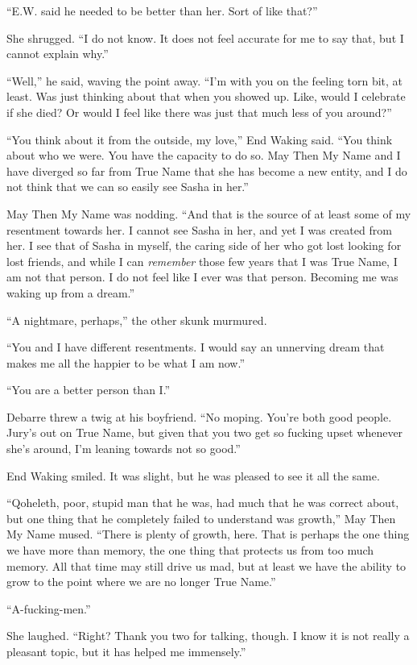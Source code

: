 ``E.W. said he needed to be better than her. Sort of like that?''

She shrugged. ``I do not know. It does not feel accurate for me to say that, but I cannot explain why.''

``Well,'' he said, waving the point away. ``I'm with you on the feeling torn bit, at least. Was just thinking about that when you showed up. Like, would I celebrate if she died? Or would I feel like there was just that much less of you around?''

``You think about it from the outside, my love,'' End Waking said. ``You think about who we were. You have the capacity to do so. May Then My Name and I have diverged so far from True Name that she has become a new entity, and I do not think that we can so easily see Sasha in her.''

May Then My Name was nodding. ``And that is the source of at least some of my resentment towards her. I cannot see Sasha in her, and yet I was created from her. I see that of Sasha in myself, the caring side of her who got lost looking for lost friends, and while I can \emph{remember} those few years that I was True Name, I am not that person. I do not feel like I ever was that person. Becoming me was waking up from a dream.''

``A nightmare, perhaps,'' the other skunk murmured.

``You and I have different resentments. I would say an unnerving dream that makes me all the happier to be what I am now.''

``You are a better person than I.''

Debarre threw a twig at his boyfriend. ``No moping. You're both good people. Jury's out on True Name, but given that you two get so fucking upset whenever she's around, I'm leaning towards not so good.''

End Waking smiled. It was slight, but he was pleased to see it all the same.

``Qoheleth, poor, stupid man that he was, had much that he was correct about, but one thing that he completely failed to understand was growth,'' May Then My Name mused. ``There is plenty of growth, here. That is perhaps the one thing we have more than memory, the one thing that protects us from too much memory. All that time may still drive us mad, but at least we have the ability to grow to the point where we are no longer True Name.''

``A-fucking-men.''

She laughed. ``Right? Thank you two for talking, though. I know it is not really a pleasant topic, but it has helped me immensely.''


